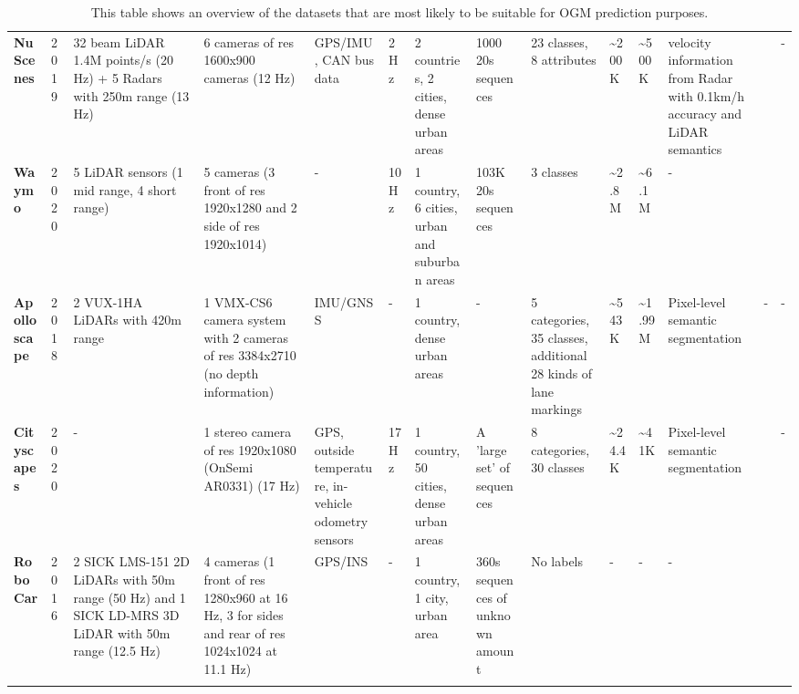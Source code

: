 {\begin{landscape}
\begin{longtable}{m{4em}m{2em}m{7em}m{7em}m{5em}m{2em}m{5em}m{7em}m{4em}m{2em}m{2em}m{5em}m{1em}m{1em}}
			\textbf{NuScenes \cite{caesar2020nuscenes}} & 2019 & 32 beam LiDAR 1.4M points/s (20 Hz) + 5 Radars with 250m range (13 Hz) & 6 cameras of res 1600x900 cameras (12 Hz) & GPS/IMU, CAN bus data & 2 Hz & 2 countries, 2 cities, dense urban areas & 1000 20s sequences & 23 classes, 8 attributes & \textasciitilde{}200K & \textasciitilde{}500K & velocity information from Radar with 0.1km/h accuracy and LiDAR semantics & \cite{roddick2020predicting} \cite{loukkal2021driving} & - \\
			\textbf{Waymo \cite{sun2020scalability}} & 2020 & 5 LiDAR sensors (1 mid range, 4 short range) & 5 cameras (3 front of res 1920x1280 and 2 side of res 1920x1014) & - & 10 Hz & 1 country, 6 cities, urban and suburban areas & 103K 20s sequences & 3 classes & \textasciitilde{}2.8M & \textasciitilde{}6.1M & - & \cite{lange2020attention} \cite{toyungyernsub2020double} & \cite{lange2020attention} \cite{toyungyernsub2020double} \\
			\textbf{Apolloscape \cite{huang2019apolloscape}} & 2018 & 2 VUX-1HA LiDARs with 420m range & 1 VMX-CS6 camera system with 2 cameras of res 3384x2710 (no depth information) & IMU/GNSS & - & 1 country, dense urban areas & - & 5 categories, 35 classes, additional 28 kinds of lane markings & \textasciitilde{}543K & \textasciitilde{}1.99M & Pixel-level semantic segmentation & - & - \\
			\textbf{Cityscapes \cite{cordts2016cityscapes}} & 2020 & - & 1 stereo camera of res 1920x1080 (OnSemi AR0331) (17 Hz) & GPS, outside temperature, in-vehicle odometry sensors & 17 Hz & 1 country, 50 cities, dense urban areas & A 'large set' of sequences & 8 categories, 30 classes & \textasciitilde{}24.4K & \textasciitilde{}41K & Pixel-level semantic segmentation & \cite{hehn2021fast} & - \\
			\textbf{RoboCar \cite{robotcardatasetijrr}} & 2016 & 2 SICK LMS-151 2D LiDARs with 50m range (50 Hz) and 1 SICK LD-MRS 3D LiDAR with 50m range (12.5 Hz) & 4 cameras (1 front of res 1280x960 at 16 Hz, 3 for sides and rear of res 1024x1024 at 11.1 Hz) & GPS/INS & - & 1 country, 1 city, urban area & 360s sequences of unknown amount & No labels & - & - & - & \cite{dequaire2018deep} \cite{wang2020l2r} & \cite{dequaire2018deep} \\
			\bottomrule
		\caption{This table shows an overview of the datasets that are most likely to be suitable for \gls{OGM} prediction purposes.}
		\label{tab:datasets_overview}	
		\end{longtable}	
	\end{landscape}
}

